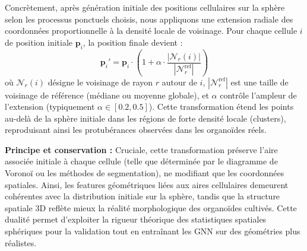 Concrètement, après génération initiale des positions cellulaires sur la sphère selon les processus ponctuels choisis, nous appliquons une extension radiale des coordonnées proportionnelle à la densité locale de voisinage. Pour chaque cellule $i$ de position initiale $\mathbf{p}_i$, la position finale devient :
\[
\mathbf{p}_i' = \mathbf{p}_i \cdot \left(1 + \alpha \cdot \frac{|\mathcal{N}_r(i)|}{|\mathcal{N}_r^{\text{ref}}|}\right)
\]
où $\mathcal{N}_r(i)$ désigne le voisinage de rayon $r$ autour de $i$, $|\mathcal{N}_r^{\text{ref}}|$ est une taille de voisinage de référence (médiane ou moyenne globale), et $\alpha$ contrôle l'ampleur de l'extension (typiquement $\alpha \in [0.2, 0.5]$). Cette transformation étend les points au-delà de la sphère initiale dans les régions de forte densité locale (clusters), reproduisant ainsi les protubérances observées dans les organoïdes réels.

\textbf{Principe et conservation :}
Cruciale, cette transformation préserve l'aire associée initiale à chaque cellule (telle que déterminée par le diagramme de Voronoï ou les méthodes de segmentation), ne modifiant que les coordonnées spatiales. Ainsi, les features géométriques liées aux aires cellulaires demeurent cohérentes avec la distribution initiale sur la sphère, tandis que la structure spatiale 3D reflète mieux la réalité morphologique des organoïdes cultivés. Cette dualité permet d'exploiter la rigueur théorique des statistiques spatiales sphériques pour la validation tout en entraînant les GNN sur des géométries plus réalistes.

